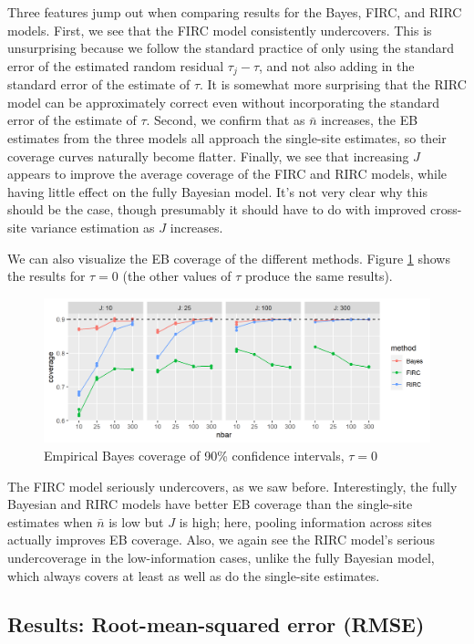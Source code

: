 \documentclass[]{article}
\begin{document}
Three features jump out when comparing results for the Bayes, FIRC, and RIRC models.
First, we see that the FIRC model consistently undercovers.
This is unsurprising because we follow the standard practice of only using the standard error of the estimated random residual $\tau_j - \tau$, and not also adding in the standard error of the estimate of $\tau$.
It is somewhat more surprising that the RIRC model can be approximately correct even without incorporating the standard error of the estimate of $\tau$.
Second, we confirm that as $\bar{n}$ increases, the EB estimates from the three models all approach the single-site estimates, so their coverage curves naturally become flatter.
Finally, we see that increasing $J$ appears to improve the average coverage of the FIRC and RIRC models, while having little effect on the fully Bayesian model.
It's not very clear why this should be the case, though presumably it should have to do with improved cross-site variance estimation as $J$ increases.

We can also visualize the EB coverage of the different methods.
Figure \ref{fig:EBcoverage_plot} shows the results for $\tau=0$ (the other values of $\tau$ produce the same results).

\begin{figure}[ht]
	\centering
	\includegraphics[width=\textwidth]{coverage_plot_eb}
	\caption{Empirical Bayes coverage of 90\% confidence intervals, $\tau=0$}
	\label{fig:EBcoverage_plot}
\end{figure}

The FIRC model seriously undercovers, as we saw before.
Interestingly, the fully Bayesian and RIRC models have better EB coverage than the single-site estimates when $\bar{n}$ is low but $J$ is high; here, pooling information across sites actually improves EB coverage.
Also, we again see the RIRC model's serious undercoverage in the low-information cases, unlike the fully Bayesian model, which always covers at least as well as do the single-site estimates.

\subsection{Results: Root-mean-squared error (RMSE)}
\end{document}
